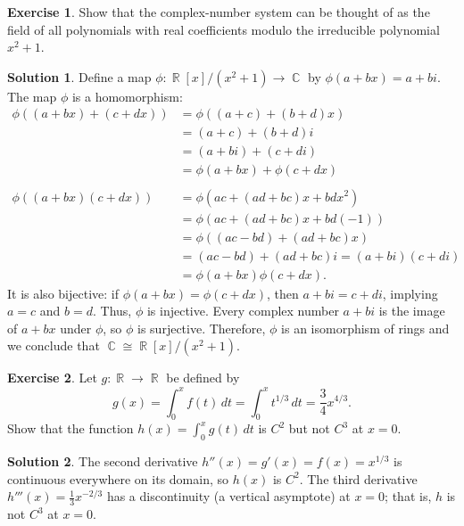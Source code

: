 \documentclass{article}
\theoremstyle{definition}
\newtheorem{exercise}{Exercise}
\newtheorem*{solution}{Solution}
\DeclareMathOperator{\R}{\mathbb{R}}
\DeclareMathOperator{\C}{\mathbb{C}}
\begin{document}
\begin{exercise}
    Show that the complex-number system can be thought of as the field of all polynomials with real coefficients modulo the irreducible polynomial \(x^2+1\).
\end{exercise}
\begin{solution}
    Define a map \(\phi:\R[x]/(x^2+1)\to\C\) by \(\phi(a+bx)=a+bi\). The map \(\phi\) is a homomorphism:
    \begin{align*}
        \phi((a+bx)+(c+dx))&=\phi((a+c)+(b+d)x)\\
        &=(a+c)+(b+d)i \\
        &=(a+bi)+(c+di) \\
        &=\phi(a+bx)+\phi(c+dx) \\
        &\\
        \phi((a+bx)(c+dx))&=\phi(ac+(ad+bc)x+bdx^2) \\
        &=\phi(ac+(ad+bc)x+bd(-1)) \\
        &=\phi((ac-bd)+(ad+bc)x) \\
        &=(ac-bd)+(ad+bc)i=(a+bi)(c+di) \\
        &=\phi(a+bx)\phi(c+dx).
    \end{align*}
    It is also bijective: if \(\phi(a+bx)=\phi(c+dx)\), then \(a+bi=c+di\), implying \(a=c\) and \(b=d\). Thus, \(\phi\) is injective. Every complex number \(a+bi\) is the image of \(a+bx\) under \(\phi\), so \(\phi\) is surjective. Therefore, \(\phi\) is an isomorphism of rings and we conclude that \(\C\cong\R[x]/(x^2+1)\).
\end{solution}

\begin{exercise}
    Let \(g:\R\to\R\) be defined by
    \[g(x)=\int_0^x f(t)\,dt=\int_0^x t^{1/3}\,dt=\frac{3}{4}x^{4/3}.\]
    Show that the function \(h(x)=\int_0^x g(t)\,dt\) is \(C^2\) but not \(C^3\) at \(x=0\).
\end{exercise}
\begin{solution}
    The second derivative \(h''(x)=g'(x)=f(x)=x^{1/3}\) is continuous everywhere on its domain, so \(h(x)\) is \(C^2\). The third derivative \(h'''(x)=\frac{1}{3}x^{-2/3}\) has a discontinuity (a vertical asymptote) at \(x=0\); that is, \(h\) is not \(C^3\) at \(x=0\).
\end{solution}
\end{document}
